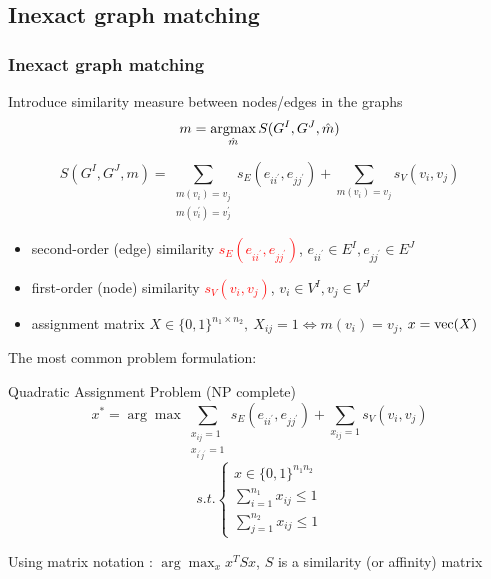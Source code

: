 \documentclass[hyperref={pdfpagelabels=false}]{beamer}
\def\vec{\mathop{\rm vec}}								%
\def\argmax{\mathop{\rm argmax}}						%
\begin{document}
\subsection{Inexact graph matching}
\begin{frame} [allowframebreaks]
\frametitle{Inexact graph matching}
Introduce similarity measure between nodes/edges in the graphs
\begin{equation*}
m = \argmax_{\hat{m}}S(G^I, G^J, \hat{m})
\end{equation*}

\begin{equation*}
	S(G^I,G^J,m)=\sum_{\substack{m(v_i)=v_j\\m(v_i^{\prime})=v_j^{\prime}}}s_E(e_{ii^\prime},e_{jj^\prime}) + \sum_{m(v_i)=v_j}s_V(v_{i},v_{j})
\end{equation*}

\begin{itemize}
\item second-order (edge) similarity \textcolor{red}{$s_E(e_{ii^\prime},e_{jj^\prime})$}, $e_{ii^\prime}\in E^I, e_{jj^\prime}\in E^J$
\item first-order (node) similarity \textcolor{red}{$s_V(v_{i},v_{j})$}, $v_i\in V^I, v_j\in V^J$
\item assignment matrix $X\in\{0,1\}^{n_1\times n_2},\ X_{ij}=1\iff m(v_i)=v_j$, $x = \vec(X)$
\end{itemize}

\framebreak
The most common problem formulation:
\begin{block}{Quadratic Assignment Problem (NP complete)~{\tiny\citep{Burkard98thequadratic}}}
$$x^* = \arg\max \sum_{\substack{x_{ij}=1\\x_{i^\prime j^\prime}=1}}s_E(e_{ii^\prime},e_{jj^\prime}) + \sum_{x_{ij}=1}s_V(v_{i},v_{j}) $$
$$ s.t. \begin{cases}
		x\in\{0,1\}^{n_1n_2} \\
		\sum_{i=1}^{n_1}x_{ij}\le 1 \\
		\sum_{j=1}^{n_2}x_{ij}\le 1
\end{cases}$$
\end{block}
Using matrix notation : $\arg\max_{x}{x^TSx}$, $S$ is a similarity (or affinity) matrix


\framebreak


\end{frame}
\end{document}
